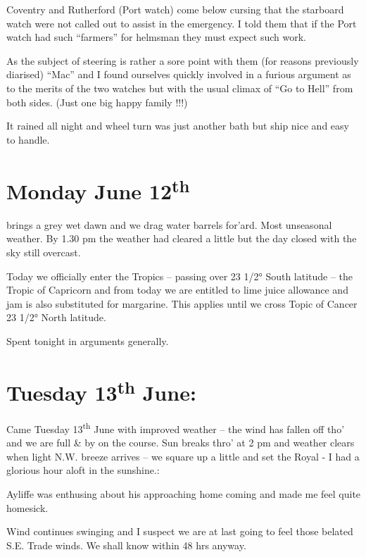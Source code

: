 \documentclass[
  11pt,
  msmallroyalvopaper
]{memoir}
\begin{document}
Coventry and Rutherford (Port watch) come below cursing that the
starboard watch were not called out to assist in the emergency. I told
them that if the Port watch had such ``farmers'' for helmsman they must
expect such work.

As the subject of steering is rather a sore point with them (for reasons
previously diarised) ``Mac'' and I found ourselves quickly involved in a
furious argument as to the merits of the two watches but with the usual
climax of ``Go to Hell'' from both sides. (Just one big happy family
!!!)

It rained all night and wheel turn was just another bath but ship nice
and easy to handle.

\hypertarget{monday-june-12th}{%
\section{\texorpdfstring{Monday June
12\textsuperscript{th}}{Monday June 12th}}\label{monday-june-12th}}

brings a grey wet dawn and we drag water barrels for'ard. Most
unseasonal weather. By 1.30 pm the weather had cleared a little but the
day closed with the sky still overcast.

Today we officially enter the Tropics -- passing over 23 1/2° South
latitude -- the Tropic of Capricorn and from today we are entitled to
lime juice allowance and jam is also substituted for margarine. This
applies until we cross Topic of Cancer 23 1/2° North latitude.

Spent tonight in arguments generally.

\hypertarget{tuesday-13th-june}{%
\section{\texorpdfstring{Tuesday 13\textsuperscript{th}
June:}{Tuesday 13th June:}}\label{tuesday-13th-june}}

Came Tuesday 13\textsuperscript{th} June with improved weather -- the
wind has fallen off tho' and we are full \& by on the course. Sun breaks
thro' at 2 pm and weather clears when light N.W. breeze arrives -- we
square up a little and set the Royal - I had a glorious hour aloft in
the sunshine.:

Ayliffe was enthusing about his approaching home coming and made me feel
quite homesick.

Wind continues swinging and I suspect we are at last going to feel those
belated S.E. Trade winds. We shall know within 48 hrs anyway.
\end{document}
